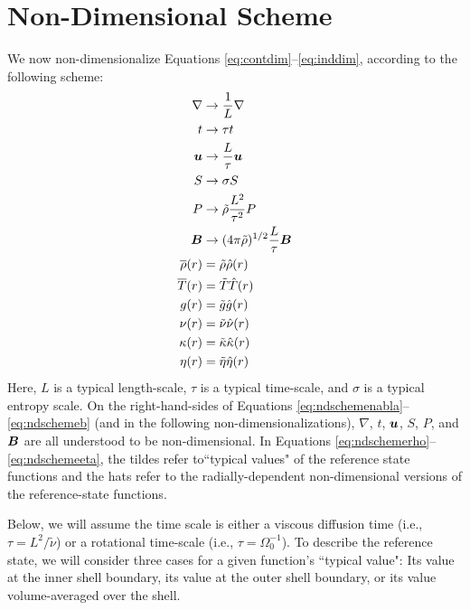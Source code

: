 \documentclass[12pt]{article}
\numberwithin{equation}{section}
\newcommand{\rhond}{\hat{\rho}}
\newcommand{\tmpnd}{\hat{T}}
\newcommand{\gnd}{\hat{g}}
\newcommand{\nund}{\hat{\nu}}
\newcommand{\kappand}{\hat{\kappa}}
\newcommand{\etand}{\hat{\eta}}
\begin{document}
	\section{Non-Dimensional Scheme}
	We now non-dimensionalize Equations \eqref{eq:contdim}--\eqref{eq:inddim}, according to the following scheme:
	\begin{subequations}\label{eq:ndscheme}
	\begin{align}
		\nabla &\rightarrow \frac{1}{L}\nabla\label{eq:ndschemenabla}\\
		t &\rightarrow \tau t\\
		\vecu &\rightarrow \frac{L}{\tau} \vecu\\
		S &\rightarrow \sigma S\\
		P &\rightarrow \tilde{\rho} \frac{L^2}{\tau^2} P\\
		\vecb &\rightarrow (4\pi\tilde{\rho})^{1/2}\frac{L}{\tau} \vecb \label{eq:ndschemeb}\\ 
		\rhoref\ofr &= \tilde{\rho} \rhond\ofr  \label{eq:ndschemerho} \\
		\tmpref\ofr &= \tilde{T} \tmpnd\ofr\\
		g\ofr &= \tilde{g} \gnd\ofr\\
		\nu\ofr &= \tilde{\nu}\nund\ofr\\
		\kappa\ofr &= \tilde{\kappa}\kappand\ofr\\
		\eta\ofr &= \tilde{\eta}\etand\ofr \label{eq:ndschemeeta} 
	\end{align}
	\end{subequations}
	Here, $L$ is a typical length-scale, $\tau$ is a typical time-scale, and $\sigma$ is a typical entropy scale. On the right-hand-sides of Equations \eqref{eq:ndschemenabla}--\eqref{eq:ndschemeb} (and in the following non-dimensionalizations), $\nabla$, $t$, $\bm{u}$, $S$, $P$, and $\bm{B}$ are all understood to be non-dimensional. In Equations \eqref{eq:ndschemerho}--\eqref{eq:ndschemeeta}, the tildes refer to``typical values" of the reference state functions and the hats refer to the radially-dependent non-dimensional versions of the reference-state functions. 
	
	Below, we will assume the time scale is either a viscous diffusion time (i.e., $\tau=L^2/\tilde{\nu}$) or a rotational time-scale (i.e., $\tau=\Omega_0^{-1}$). To describe the reference state, we will consider three cases for a given function's ``typical value": Its value at the inner shell boundary, its value at the outer shell boundary, or its value volume-averaged over the shell. 
	
\end{document}
